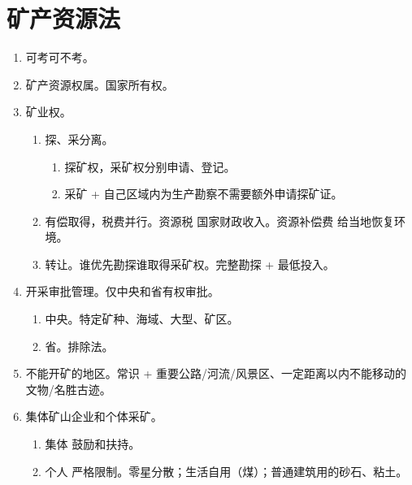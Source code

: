 \section{矿产资源法}
\begin{enumerate}
  \item 可考可不考。
  \item 矿产资源权属。国家所有权。
  \item 矿业权。
        \begin{enumerate}
          \item 探、采分离。
                \begin{enumerate}
                  \item 探矿权，采矿权分别申请、登记。
                  \item 采矿 + 自己区域内为生产勘察不需要额外申请探矿证。
                \end{enumerate}
          \item 有偿取得，税费并行。资源税 \yjt 国家财政收入。资源补偿费 \yjt 给当地恢复环境。
          \item 转让。\yi 谁优先勘探谁取得采矿权。\er 完整勘探 + 最低投入。
        \end{enumerate}
  \item 开采审批管理。仅中央和省有权审批。
        \begin{enumerate}
          \item 中央。特定矿种、海域、大型、矿区。
          \item 省。排除法。
        \end{enumerate}
  \item 不能开矿的地区。常识 + 重要公路/河流/风景区、一定距离以内不能移动的文物/名胜古迹。
  \item 集体矿山企业和个体采矿。
        \begin{enumerate}
          \item 集体 \yjt 鼓励和扶持。
          \item 个人 \yjt 严格限制。零星分散；生活自用（煤）；普通建筑用的砂石、粘土。
        \end{enumerate}
\end{enumerate}
